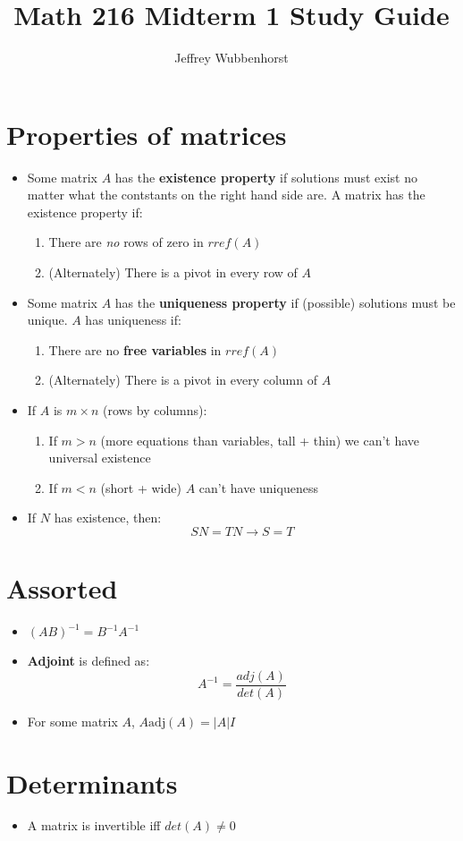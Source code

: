 \documentclass[10pt,letterpaper]{article}
\author{Jeffrey Wubbenhorst}
\title{Math 216 Midterm 1 Study Guide }
\begin{document}
\maketitle

\section*{Properties of matrices}

\begin{itemize}
\item Some matrix $A$ has the \textbf{existence property} if solutions must exist no matter what the 
contstants on the right hand side are. A matrix has the existence property if: 
\begin{enumerate}
\item There are \textit{no} rows of zero in $rref(A)$
\item (Alternately) There is a pivot in every row of $A$
\end{enumerate}

\item Some matrix $A$ has the \textbf{uniqueness property }if (possible) solutions must be unique. $A$ has uniqueness if: 
\begin{enumerate}
\item There are no \textbf{free variables} in $rref(A)$
\item (Alternately) There is a pivot in every column of $A$
\end{enumerate}

\item If $A$ is $m\times n$ (rows by columns): 
\begin{enumerate}
\item If $m>n$ (more equations than variables, tall + thin) we can't have universal existence 
\item If $m<n$ (short + wide) $A$ can't have uniqueness

\end{enumerate}

\item If $N$ has existence, then: 
$$SN = TN \to S = T$$

\end{itemize}

\section{Assorted}

\begin{itemize}

\item $(AB)^{-1}=B^{-1}A^{-1}$
\item \textbf{Adjoint} is defined as: 
$$A^{-1}=\frac{adj(A)}{det(A)}$$

\item For some matrix $A$, $A\mbox{adj}(A)=|A|I$


\end{itemize}

\section{Determinants}
\begin{itemize}
\item A matrix is invertible iff $det(A)\neq 0$


\end{itemize}
\end{document}
